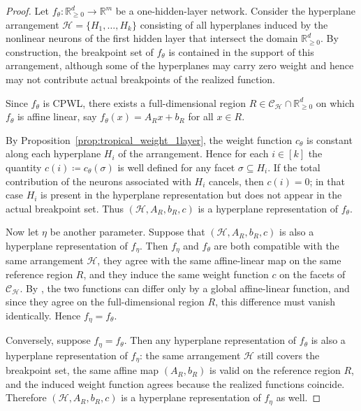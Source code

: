 \documentclass{article}
\theoremstyle{definition}
\newcommand{\R}{\mathbb{R}}
\newcommand{\complex}{\mathcal{C}}
\newcommand{\orthant}[1]{\R_{\geq 0}^{#1}}
\begin{document}
\begin{proof}
Let $f_\theta \colon \orthant{d} \to \R^m$ be a one-hidden-layer network.
Consider the hyperplane arrangement
$
\mathcal H=\{H_1,\dots,H_k\}
$
consisting of all hyperplanes induced by the nonlinear neurons of the first hidden layer that intersect the domain $\orthant{d}$. By construction, the breakpoint set of $f_\theta$ is contained in the support of this arrangement, although some of the hyperplanes may carry zero weight and hence may not contribute actual breakpoints of the realized function.

Since $f_\theta$ is CPWL, there exists a full-dimensional region
$
R \in \complex_{\mathcal H}\cap \orthant{d}
$
on which $f_\theta$ is affine linear, say
$
f_\theta(x)=A_Rx+b_R$ for all $ x\in R.
$

By Proposition~\ref{prop:tropical_weight_1layer}, the weight function $c_\theta$ is constant along each hyperplane $H_i$ of the arrangement. Hence for each $i\in[k]$ the quantity
$
c(i)\coloneqq c_\theta(\sigma)
$
is well defined for any facet $\sigma \subseteq H_i$.
If the total contribution of the neurons associated with $H_i$ cancels, then $c(i)=0$; in that case $H_i$ is present in the hyperplane representation but does not appear in the actual breakpoint set. Thus $(\mathcal H,A_R,b_R,c)$ is a hyperplane representation of $f_\theta$.

Now let $\eta$ be another parameter. Suppose that $(\mathcal H,A_R,b_R,c)$ is also a hyperplane representation of $f_\eta$. Then $f_\eta$ and $f_\theta$ are both compatible with the same arrangement $\mathcal H$, they agree with the same affine-linear map on the same reference region $R$, and they induce the same weight function $c$ on the facets of $\complex_{\mathcal H}$. By , the two functions can differ only by a global affine-linear function, and since they agree on the full-dimensional region $R$, this difference must vanish identically. Hence
$f_\eta=f_\theta$. 

Conversely, suppose $f_\eta=f_\theta$. Then any hyperplane representation of $f_\theta$ is also a hyperplane representation of $f_\eta$: the same arrangement $\mathcal H$ still covers the breakpoint set, the same affine map $(A_R,b_R)$ is valid on the reference region $R$, and the induced weight function agrees because the realized functions coincide. Therefore $(\mathcal H,A_R,b_R,c)$ is a hyperplane representation of $f_\eta$ as well.
\end{proof}
\end{document}
